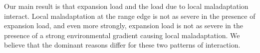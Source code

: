 

Our main result is that expansion load and the load due to local maladaptation interact. Local maladaptation at the range edge is not as severe in the presence of expansion load, and even more strongly, expansion load is not as severe in the presence of a strong environmental gradient causing local maladaptation. We believe that the dominant reasons differ for these two patterns of interaction. 

